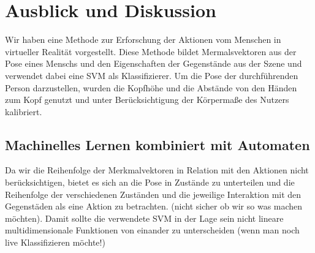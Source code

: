 \section{Ausblick und Diskussion}
Wir haben eine Methode zur Erforschung der Aktionen vom Menschen in virtueller Realität vorgestellt. Diese Methode bildet Mermalsvektoren aus der Pose eines Menschs und den Eigenschaften der Gegenstände aus der Szene und verwendet dabei eine SVM als Klassifizierer. Um die Pose der durchführenden Person darzustellen, wurden die Kopfhöhe und die Abstände von den Händen zum Kopf genutzt und unter Berücksichtigung der Körpermaße des Nutzers kalibriert.

\subsection{Machinelles Lernen kombiniert mit Automaten}
Da wir die Reihenfolge der Merkmalvektoren in Relation mit den Aktionen nicht berücksichtigen, bietet es sich an die Pose in Zustände zu unterteilen und die Reihenfolge der verschiedenen Zuständen und die jeweilige Interaktion mit den Gegenstäden als eine Aktion zu betrachten. (nicht sicher ob wir so was machen möchten). Damit sollte die verwendete SVM in der Lage sein nicht lineare multidimensionale Funktionen von einander zu unterscheiden (wenn man noch live Klassifizieren möchte!)




